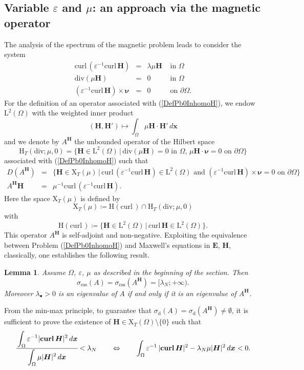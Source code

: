 \documentclass[11pt,a4paper]{article}
\newcommand{\dsp}{\displaystyle}
\newcommand{\eps}{\varepsilon}
\newcommand{\Om}{\Omega}
\newcommand{\mrm}[1]{\mathrm{#1}}
\newcommand{\bfx}{\boldsymbol{x}}
\newcommand{\bfnu}{\boldsymbol{\nu}}
\newcommand{\mL}{\mrm{L}}
\newcommand{\mH}{\mrm{H}}
\newcommand{\mX}{\mrm{X}}
\newcommand{\curlvec}{\boldsymbol{\mrm{curl}}\,}
\renewcommand{\div}{\mrm{div}}
\def\E{\boldsymbol{E}}
\def\H{\boldsymbol{H}}
\newtheorem{lemma}[theorem]{Lemma}
\begin{document}
\subsection{Variable $\eps$ and $\mu$: an approach via the magnetic operator}


The analysis of the spectrum of the magnetic problem leads to consider the system
\begin{equation}\label{DefPb0InhomoH}
\begin{array}{|rcll}
\curlvec\left(\eps^{-1}\curlvec\H\right)&=&\lambda\mu\H&\mbox{ in }\Om\\[2pt]
\div(\mu\H)&=&0&\mbox{ in }\Om\\[2pt]
(\eps^{-1}\curlvec\H)\times\bfnu&=&0&\mbox{ on }\partial\Om.
\end{array}
\end{equation}
For the definition of an operator associated with (\ref{DefPb0InhomoH}), we endow $\boldsymbol{\mL}^2(\Om)$ with the weighted inner product 
\[
(\H,\H')\mapsto\int_{\Om}\mu\H\cdot\H'\,d\bfx
\]
and we denote by $A^{\H}$ the unbounded operator of the Hilbert space
\[
\boldsymbol{\mH}_T(\div;\mu,0)=\{\H\in\boldsymbol{\mL}^2(\Om)\,|\,\div(\mu\H)=0\mbox{ in }\Om,\,\mu\H\cdot\bfnu=0\mbox{ on }\partial\Om\}
\]
associated with (\ref{DefPb0InhomoH}) such that 
\begin{equation}\label{DefMagOp}
\begin{array}{|rcl}
D(A^{\H})&=&\{\H\in\boldsymbol{\mX}_T(\mu)\,|\,\curlvec(\eps^{-1}\curlvec\H)\in\boldsymbol{\mL}^2(\Om)\mbox{ and }(\eps^{-1}\curlvec\H)\times\bfnu=0\mbox{ on }\partial\Om\}\\[4pt]
A^{\H}\H&=&\mu^{-1}\curlvec(\eps^{-1}\curlvec\H).
\end{array}
\end{equation}
Here the space $\boldsymbol{\mX}_T(\mu)$ is defined by
\begin{equation}\label{DefSpaceH}
\boldsymbol{\mX}_T(\mu)\coloneqq\boldsymbol{\mH}(\curlvec)\cap\boldsymbol{\mH}_T(\div;\mu,0)
\end{equation}
with 
\[
\boldsymbol{\mH}(\curlvec)\coloneqq\{\H\in\boldsymbol{\mL}^2(\Om)\,|\,\curlvec\H\in\boldsymbol{\mL}^2(\Om)\}.
\]
This operator $A^{\H}$ is self-adjoint and non-negative. Exploiting the equivalence between Problem (\ref{DefPb0InhomoH}) and Maxwell's equations in $\E$, $\H$, classically, one establishes the following result.
\begin{lemma}\label{LemmaSpectresEH}
Assume $\Om$, $\eps$, $\mu$ as described in the beginning of the section. Then 
\[
\sigma_{\mrm{ess}}(A)=\sigma_{\mrm{ess}}(A^{\H})=[\lambda_N;+\infty).
\]
Moreover $\lambda_\bullet>0$ is an eigenvalue of $A$ if and only if it is an eigenvalue of $A^{\H}$.
\end{lemma}
\noindent From the min-max principle, to guarantee that $\sigma_{\mrm{d}}(A)=\sigma_{\mrm{d}}(A^{\H})\ne\emptyset$, it is sufficient to prove the existence of 
$\H\in\boldsymbol{\mX}_T(\Om)\setminus\{0\}$ such that
\[
\cfrac{\dsp\int_{\Om}\eps^{-1}|\curlvec\H|^2\,d\bfx}{\dsp\int_{\Om}\mu|\H|^2\,d\bfx}<\lambda_N\qquad\Leftrightarrow\qquad \dsp\int_{\Om}\eps^{-1}\,|\curlvec\H|^2-\lambda_N\mu|\H|^2\,d\bfx<0.
\]
\end{document}
